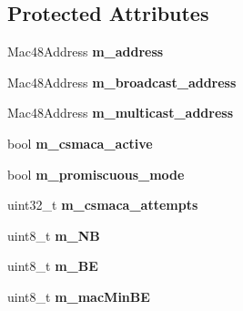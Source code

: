 \subsection*{\-Protected \-Attributes}
\begin{DoxyCompactItemize}
\item 
\hypertarget{classns3_1_1PLC__Mac_a42dd0371196965bb9d1d0fb1ca7c6636}{\-Mac48\-Address {\bfseries m\-\_\-address}}\label{classns3_1_1PLC__Mac_a42dd0371196965bb9d1d0fb1ca7c6636}

\item 
\hypertarget{classns3_1_1PLC__Mac_a58102027886652c808e7670790841962}{\-Mac48\-Address {\bfseries m\-\_\-broadcast\-\_\-address}}\label{classns3_1_1PLC__Mac_a58102027886652c808e7670790841962}

\item 
\hypertarget{classns3_1_1PLC__Mac_a1b7dd1319e291def0f3bee91ff0591a9}{\-Mac48\-Address {\bfseries m\-\_\-multicast\-\_\-address}}\label{classns3_1_1PLC__Mac_a1b7dd1319e291def0f3bee91ff0591a9}

\item 
\hypertarget{classns3_1_1PLC__Mac_a6b7007e1b65915ebbeefeb429e6e4095}{bool {\bfseries m\-\_\-csmaca\-\_\-active}}\label{classns3_1_1PLC__Mac_a6b7007e1b65915ebbeefeb429e6e4095}

\item 
\hypertarget{classns3_1_1PLC__Mac_a0719536f0d86f13ec19fc7fe31e8bcf8}{bool {\bfseries m\-\_\-promiscuous\-\_\-mode}}\label{classns3_1_1PLC__Mac_a0719536f0d86f13ec19fc7fe31e8bcf8}

\item 
\hypertarget{classns3_1_1PLC__Mac_a76d7ccf00276e0659e6a357dceb63788}{uint32\-\_\-t {\bfseries m\-\_\-csmaca\-\_\-attempts}}\label{classns3_1_1PLC__Mac_a76d7ccf00276e0659e6a357dceb63788}

\item 
\hypertarget{classns3_1_1PLC__Mac_acfdf9bc2132f69830749e814bb19ec28}{uint8\-\_\-t {\bfseries m\-\_\-\-N\-B}}\label{classns3_1_1PLC__Mac_acfdf9bc2132f69830749e814bb19ec28}

\item 
\hypertarget{classns3_1_1PLC__Mac_a2e58031629d126abb98711661d2f517e}{uint8\-\_\-t {\bfseries m\-\_\-\-B\-E}}\label{classns3_1_1PLC__Mac_a2e58031629d126abb98711661d2f517e}

\item 
\hypertarget{classns3_1_1PLC__Mac_af838b2e81b22975e2d5ef6ed5c9c51fe}{uint8\-\_\-t {\bfseries m\-\_\-mac\-Min\-B\-E}}\label{classns3_1_1PLC__Mac_af838b2e81b22975e2d5ef6ed5c9c51fe}


\end{DoxyCompactItemize}
